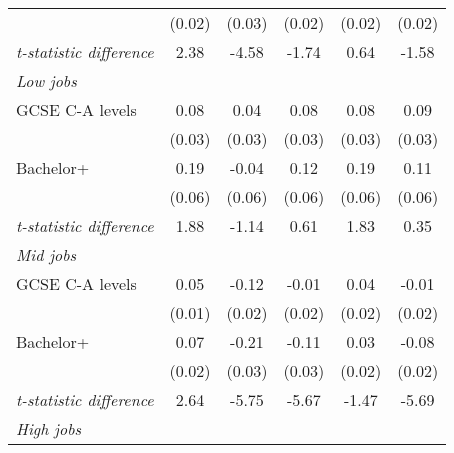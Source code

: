 \begin{center}
\begin{threeparttable}[!h]
\begin{tabular}{lccccc}
                    &      (0.02)         &      (0.03)         &      (0.02)         &      (0.02)         &      (0.02)         \\
\textit{t-statistic difference}&        2.38         &       -4.58         &       -1.74         &        0.64         &       -1.58         \\
\midrule\textit{Low jobs}\vspace{1mm} \\ 
\hspace{3mm}GCSE C-A levels&        0.08\sym{**} &        0.04         &        0.08\sym{**} &        0.08\sym{**} &        0.09\sym{**} \\
                    &      (0.03)         &      (0.03)         &      (0.03)         &      (0.03)         &      (0.03)         \\
\hspace{3mm}Bachelor+&        0.19\sym{***}&       -0.04         &        0.12         &        0.19\sym{**} &        0.11         \\
                    &      (0.06)         &      (0.06)         &      (0.06)         &      (0.06)         &      (0.06)         \\
\textit{t-statistic difference}&        1.88         &       -1.14         &        0.61         &        1.83         &        0.35         \\
\midrule\textit{Mid jobs}\vspace{1mm} \\ 
\hspace{3mm}GCSE C-A levels&        0.05\sym{***}&       -0.12\sym{***}&       -0.01         &        0.04\sym{*}  &       -0.01         \\
                    &      (0.01)         &      (0.02)         &      (0.02)         &      (0.02)         &      (0.02)         \\
\hspace{3mm}Bachelor+&        0.07\sym{***}&       -0.21\sym{***}&       -0.11\sym{***}&        0.03         &       -0.08\sym{***}\\
                    &      (0.02)         &      (0.03)         &      (0.03)         &      (0.02)         &      (0.02)         \\
\textit{t-statistic difference}&        2.64         &       -5.75         &       -5.67         &       -1.47         &       -5.69         \\
\midrule\textit{High jobs}\vspace{1mm} \\ 

\end{tabular}
\end{threeparttable}
\end{center}
